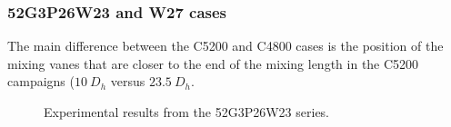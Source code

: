 \subsubsection{52G3P26W23 and W27 cases}


The main difference between the C5200 and C4800 cases is the position of the mixing vanes that are closer to the end of the mixing length in the C5200 campaigns ($10\ D_{h}$ versus $23.5\ D_{h}$.

\begin{figure}[!h]
\centering
{}

\caption{Experimental results from the 52G3P26W23 series.}
\label{fig:exp_52G3P26W23}
\end{figure}


